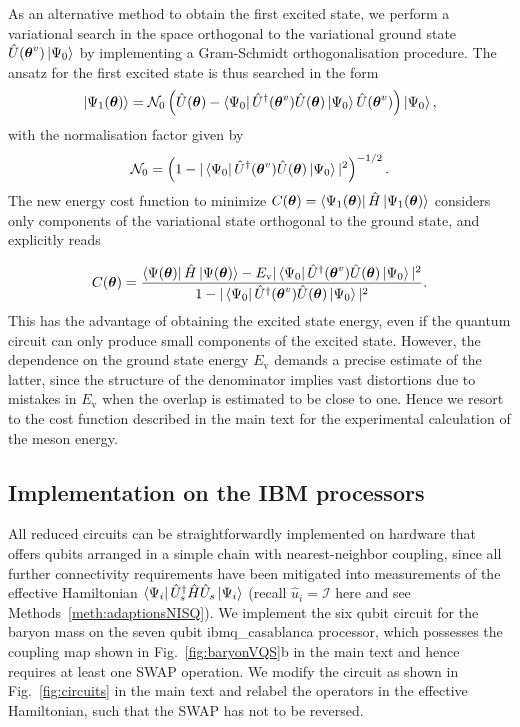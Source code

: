 \documentclass[twocolumn,aps,showpacs,prb,superscriptaddress,floatfix,10pt,nofootinbib]{revtex4-2}
\begin{document}
As an alternative method to obtain the first excited state, we perform a variational search in the space orthogonal to the variational ground state $\hat{U}(\boldsymbol{\theta}^v)\ket{\Psi_0}$ by implementing a Gram-Schmidt orthogonalisation procedure. The ansatz for the first excited state is thus searched in the form
\begin{equation}
\ket{\Psi_{1}(\boldsymbol{\theta})}=\mathcal{N}_{0}\left( \hat{U}(\boldsymbol{\theta})-\bra{\Psi_{0}}\hat{U}^{\dagger}(\boldsymbol{\theta}^v)\hat{U}(\boldsymbol{\theta})\ket{\Psi_0}\hat{U}(\boldsymbol{\theta}^v)\right)\ket{\Psi_0},
\end{equation}
with the normalisation factor given by
\begin{equation}
\mathcal{N}_{0}=\left(1-|\bra{\Psi_0}\hat{U}^{\dagger}(\boldsymbol{\theta}^v)\hat{U}(\boldsymbol{\theta})\ket{\Psi_0}|^{2}\right)^{-1/2}.
\end{equation} 
The new energy cost function to minimize $C(\boldsymbol{\theta}) =\bra{\Psi_{1}(\boldsymbol{\theta})} \hat{H} \ket{\Psi_{1}(\boldsymbol{\theta})}$ considers only components of the variational state orthogonal to the ground state, and explicitly reads 

\begin{equation}
C(\boldsymbol{\theta}) = \frac{\bra{\Psi(\boldsymbol{\theta})}\hat{H}\ket{\Psi(\boldsymbol{\theta})} - E_\text{v} |\bra{\Psi_0}\hat{U}^{\dagger}(\boldsymbol{\theta}^v)\hat{U}(\boldsymbol{\theta})\ket{\Psi_0}|^2}{1-|\bra{\Psi_0}\hat{U}^{\dagger}(\boldsymbol{\theta}^v)\hat{U}(\boldsymbol{\theta})\ket{\Psi_0}|^2}.
\end{equation}
This has the advantage of obtaining the excited state energy, even if the quantum circuit can only produce small components of the excited state. However, the dependence on the ground state energy $E_\text{v}$ demands a precise estimate of the latter, since the structure of the denominator implies vast distortions due to mistakes in $E_\text{v}$ when the overlap is estimated to be close to one. Hence we resort to the cost function described in the main text for the experimental calculation of the meson energy.

\subsection{Implementation on the IBM processors}
\label{meth:implementation}
All reduced circuits can be straightforwardly implemented on hardware that offers qubits arranged in a simple chain with nearest-neighbor coupling, since all further connectivity requirements have been mitigated into measurements of the effective Hamiltonian $\bra{\Psi_i}\hat{U}_s^\dagger\hat{H}\hat{U}_s\ket{\Psi_i}$ (recall $\hat{u}_i=\mathcal{I}$ here and see Methods~\ref{meth:adaptionsNISQ}).
We implement the six qubit circuit for the baryon mass on the seven qubit ibmq\_casablanca processor, which possesses the coupling map shown in Fig.~\ref{fig:baryonVQS}{b} in the main text and hence requires at least one SWAP operation. We modify the circuit as shown in Fig.~\ref{fig:circuits} in the main text and relabel the operators in the effective Hamiltonian, such that the SWAP has not to be reversed. 
\end{document}
